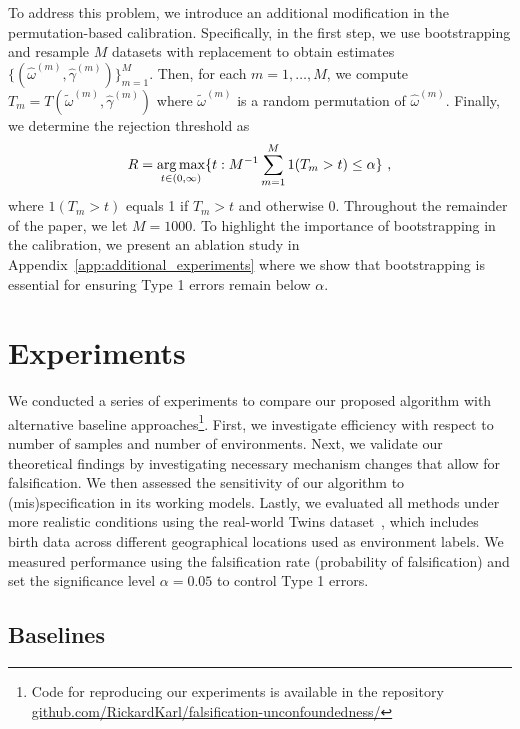 \documentclass{article}
\begin{document}
To address this problem, we introduce an additional modification in the permutation-based calibration. Specifically, in the first step, we use bootstrapping and resample $M$ datasets with replacement to obtain estimates $\{(\widehat{\omega}^{(m)}, \widehat{\gamma}^{(m)})\}_{m=1}^M$. Then, for each $m=1,\dots, M$, we compute $T_m= T(\widetilde{\omega}^{(m)}, \widehat{\gamma}^{(m)})$ where $\widetilde{\omega}^{(m)}$ is a random permutation of $\widehat{\omega}^{(m)}$. Finally, we determine the rejection threshold as 
$$R=\operatorname*{arg\,max}_{t\in (0,\infty)}\{ t : M^{-1}\sum_{m=1}^M 1(T_m > t) \leq \alpha\}~,$$
where $1(T_m > t)$ equals 1 if $T_m>t$ and otherwise 0. Throughout the remainder of the paper, we let $M=1000$. To highlight the importance of bootstrapping in the calibration, we present an ablation study in Appendix~\ref{app:additional_experiments} where we show that bootstrapping is essential for ensuring Type 1 errors remain below $\alpha$.

\section{Experiments} 


We conducted a series of experiments to compare our proposed algorithm with alternative baseline approaches\footnote{Code for reproducing our experiments is available in the repository \href{https://github.com/RickardKarl/falsification-unconfoundedness/}{github.com/RickardKarl/falsification-unconfoundedness/}}. First, we investigate efficiency with respect to number of samples and number of environments. Next, we validate our theoretical findings by investigating necessary mechanism changes that allow for falsification. We then assessed the sensitivity of our algorithm to (mis)specification in its working models. Lastly, we evaluated all methods under more realistic conditions using the real-world Twins dataset~\citep{almond2005costs}, which includes birth data across different geographical locations used as environment labels. We measured performance using the falsification rate (probability of falsification) and set the significance level $\alpha=0.05$ to control Type 1 errors.

\subsection{Baselines}
\end{document}
